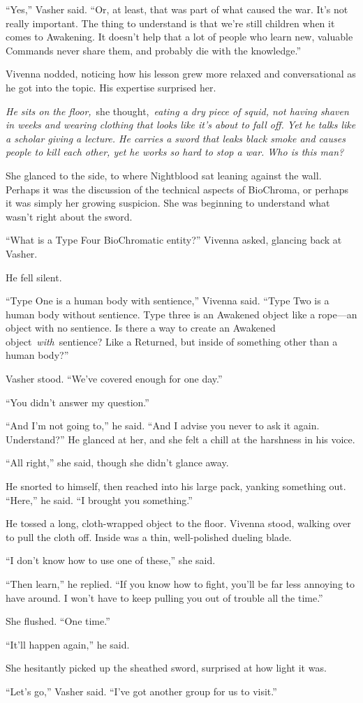 “Yes,” Vasher said. “Or, at least, that was part of what caused the war. It’s not really important. The thing to understand is that we’re still children when it comes to Awakening. It doesn’t help that a lot of people who learn new, valuable Commands never share them, and probably die with the knowledge.”

Vivenna nodded, noticing how his lesson grew more relaxed and conversational as he got into the topic. His expertise surprised her.

\textit{He sits on the floor,}~she thought,~\textit{eating a dry piece of squid, not having shaven in weeks and wearing clothing that looks like it’s about to fall off. Yet he talks like a scholar giving a lecture. He carries a sword that leaks black smoke and causes people to kill each other, yet he works so hard to stop a war. Who is this man?}

She glanced to the side, to where Nightblood sat leaning against the wall. Perhaps it was the discussion of the technical aspects of BioChroma, or perhaps it was simply her growing suspicion. She was beginning to understand what wasn’t right about the sword.

“What is a Type Four BioChromatic entity?” Vivenna asked, glancing back at Vasher.

He fell silent.

“Type One is a human body with sentience,” Vivenna said. “Type Two is a human body without sentience. Type three is an Awakened object like a rope—an object with no sentience. Is there a way to create an Awakened object~\textit{with}~sentience? Like a Returned, but inside of something other than a human body?”

Vasher stood. “We’ve covered enough for one day.”

“You didn’t answer my question.”

“And I’m not going to,” he said. “And I advise you never to ask it again. Understand?” He glanced at her, and she felt a chill at the harshness in his voice.

“All right,” she said, though she didn’t glance away.

He snorted to himself, then reached into his large pack, yanking something out. “Here,” he said. “I brought you something.”

He tossed a long, cloth-wrapped object to the floor. Vivenna stood, walking over to pull the cloth off. Inside was a thin, well-polished dueling blade.

“I don’t know how to use one of these,” she said.

“Then learn,” he replied. “If you know how to fight, you’ll be far less annoying to have around. I won’t have to keep pulling you out of trouble all the time.”

She flushed. “One time.”

“It’ll happen again,” he said.

She hesitantly picked up the sheathed sword, surprised at how light it was.

“Let’s go,” Vasher said. “I’ve got another group for us to visit.”


